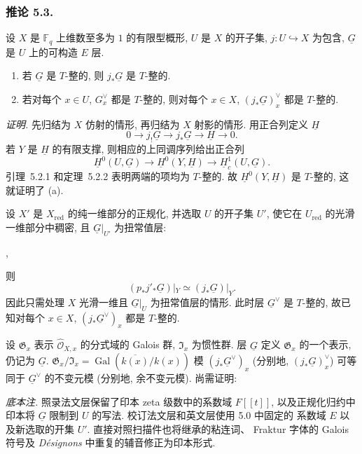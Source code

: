 \subsubsection*{推论 5.3.}
设 $X$ 是 $\mathbb F_q$ 上维数至多为 $1$ 的有限型概形, $U$ 是 $X$ 的开子集,
$j:U\hookrightarrow X$ 为包含, $\underline G$ 是 $U$ 上的可构造 $E$ 层.

\begin{enumerate}[label=(\alph*)]
\item 若 $\underline G$ 是 $T$-整的, 则 $j_*\underline G$ 是 $T$-整的.
\item 若对每个 $x\in U$, $G_x^\vee$ 都是 $T$-整的, 则对每个 $x\in X$,
  $(j_*\underline G)_x^\vee$ 都是 $T$-整的.
\end{enumerate}

\medskip
\noindent\emph{证明.}
先归结为 $X$ 仿射的情形, 再归结为 $X$ 射影的情形. 用正合列定义 $\underline H$
\[
0\longrightarrow j_!\underline G\longrightarrow j_*\underline G
\longrightarrow\underline H\longrightarrow0.
\]
若 $Y$ 是 $\underline H$ 的有限支撑, 则相应的上同调序列给出正合列
\[
\underline H^0(U,\underline G)\longrightarrow
\underline H^0(Y,\underline H)\longrightarrow
\underline H_c^1(U,\underline G).
\]
引理~5.2.1 和定理~5.2.2 表明两端的项均为 $T$-整的.
故 $\underline H^0(Y,\underline H)$ 是 $T$-整的, 这就证明了 (a).

设 $X'$ 是 $X_{\mathrm{red}}$ 的纯一维部分的正规化, 并选取 $U$ 的开子集 $U'$,
使它在 $U_{\mathrm{red}}$ 的光滑一维部分中稠密, 且 $\underline G|_{U'}$ 为扭常值层:
\begin{center}
\qquad ,
\end{center}
则
\[
(p_*j'_*\underline G)|_Y\simeq(j_*\underline G)|_Y.
\]
因此只需处理 $X$ 光滑一维且 $\underline G|_U$ 为扭常值层的情形.
此时层 $\underline G^\vee$ 是 $T$-整的, 故已知对每个 $x\in X$,
$(j_*\underline G^\vee)_x$ 都是 $T$-整的.

设 $\mathfrak G_x$ 表示 $\widehat{\mathcal O}_{X,x}$ 的分式域的 Galois 群,
$\mathfrak I_x$ 为惯性群. 层 $\underline G$ 定义 $\mathfrak G_x$ 的一个表示,
仍记为 $\underline G$. $\mathfrak G_x/\mathfrak I_x=
\operatorname{Gal}(\overline{k(x)}/k(x))$ 模 $(j_*\underline G^\vee)_x$
(分别地, $(j_*\underline G)_x^\vee$) 可等同于 $\underline G^\vee$ 的不变元模
(分别地, 余不变元模). 尚需证明:

\medskip
\noindent\emph{底本注.}
照录法文层保留了印本 zeta 级数中的系数域 $F[[t]]$, 以及正规化归约中
印本将 $\underline G$ 限制到 $U$ 的写法. 校订法文层和英文层使用 5.0 中固定的
系数域 $E$ 以及新选取的开集 $U'$. 直接对照扫描件也将继承的粘连词、
Fraktur 字体的 Galois 符号及 \emph{D\'esignons} 中重复的辅音修正为印本形式.

